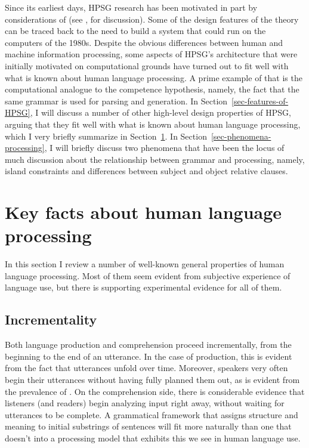 \documentclass[a4paper]{article}
\begin{document}
Since its earliest days, HPSG research has been motivated in part by considerations of  (see , for discussion).  Some of the design features of the theory can be traced back to the need to build a system that could run on the computers of the 1980s.  Despite the obvious differences between human and machine information processing, some aspects of HPSG's architecture that were initially motivated on computational grounds have turned out to fit well with what is known about human language processing.  A prime example of that is the computational analogue to the competence hypothesis, namely, the fact that the same grammar is used for parsing and generation. In Section~\ref{sec-features-of-HPSG}, I will discuss a number of other high-level design properties of HPSG, arguing that they fit well with what is known about human language processing, which I very briefly summarize in Section~\ref{sec-key-facts}.  In Section~\ref{sec-phenomena-processing}, I will briefly discuss two phenomena that have been the locus of much discussion about the relationship between grammar and processing, namely, island constraints and differences between subject and object relative clauses.

\section{Key facts about human language processing}
\label{sec-key-facts}

In this section I review a number of well-known general properties of human language processing.  Most of them seem evident from subjective experience of language use, but there is supporting experimental evidence for all of them.  

\subsection{Incrementality}

Both language production and comprehension proceed incrementally, from the beginning to the end of an utterance.  In the case of production, this is evident from the fact that utterances unfold over time.  Moreover, speakers very often begin their utterances without having fully planned them out, as is evident from the prevalence of .  On the comprehension side, there is considerable evidence that listeners (and readers) begin analyzing input right away, without waiting for utterances to be complete.  A grammatical framework that assigns structure and meaning to initial substrings of sentences will fit more naturally than one that doesn't into a processing model that exhibits this  we see in human language use.  
\end{document}
